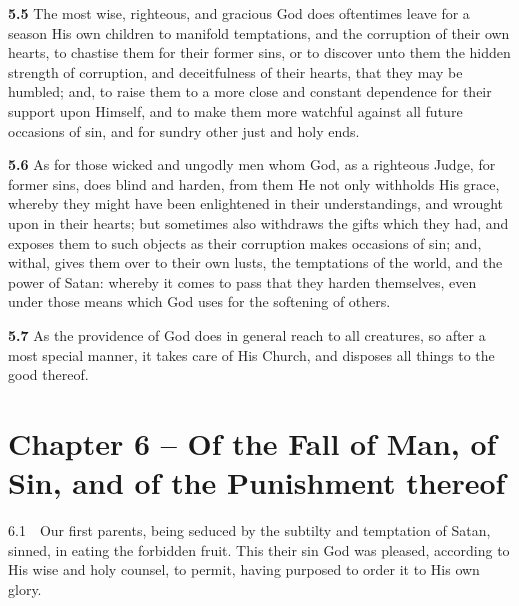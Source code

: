 \par\textbf{5.5} The most wise, righteous, and gracious God does oftentimes leave for a season His own children to manifold temptations, and the corruption of their own hearts, to chastise them for their former sins, or to discover unto them the hidden strength of corruption, and deceitfulness of their hearts, that they may be humbled; and, to raise them to a more close and constant dependence for their support upon Himself, and to make them more watchful against all future occasions of sin, and for sundry other just and holy ends.   

\par\textbf{5.6} As for those wicked and ungodly men whom God, as a righteous Judge, for former sins, does blind and harden, from them He not only withholds His grace, whereby they might have been enlightened in their understandings, and wrought upon in their hearts; but sometimes also withdraws the gifts which they had, and exposes them to such objects as their corruption makes occasions of sin; and, withal, gives them over to their own lusts, the temptations of the world, and the power of Satan: whereby it comes to pass that they harden themselves, even under those means which God uses for the softening of others.   

\par\textbf{5.7} As the providence of God does in general reach to all creatures, so after a most special manner, it takes care of His Church, and disposes all things to the good thereof.

\section{Chapter 6 -- Of the Fall of Man, of Sin, and of the Punishment thereof} 6.1\ \ Our first parents, being seduced by the subtilty and temptation of Satan, sinned, in eating the forbidden fruit. This their sin God was pleased, according to His wise and holy counsel, to permit, having purposed to order it to His own glory.   


